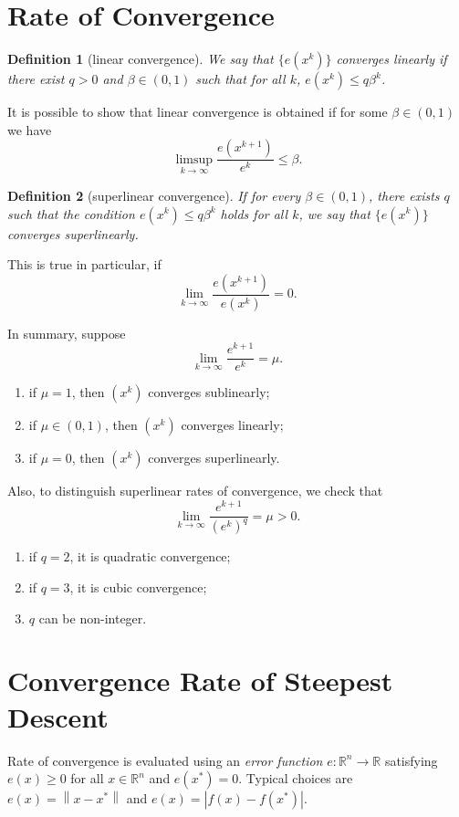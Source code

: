 \documentclass[12pt,a4paper]{report}
\numberwithin{equation}{section}
\theoremstyle{mystyle}
\newtheorem{definition}{Definition}[section]
\newcommand{\R}{\mathbb{R}}
\newcommand{\abs}[1]{\left\lvert #1 \right\rvert}
\newcommand{\norm}[1]{\left\lVert #1 \right\rVert}
\begin{document}
	\section{Rate of Convergence}
		\begin{definition}[linear convergence]
				We say that $\{e(x^k)\}$ converges \emph{linearly} if there exist $q>0$ and $\beta\in (0,1)$ such that for all $k$, $e(x^k)\leq q \beta^k$.
			\end{definition}
	 It is possible to show that linear convergence is obtained if for some $\beta \in (0,1)$ we have
	 $$
	 \limsup_{k\to\infty}\frac{e(x^{k+1})}{e^{k}}\leq \beta.
	 $$
	 \begin{definition}[superlinear convergence]
			 	If for every $\beta\in (0,1)$, there exists $q$ such that the condition $e(x^k)\leq q\beta^k$ holds for all $k$, we say that $\{e(x^k)\}$ converges \emph{superlinearly}.
	 \end{definition}
		This is true in particular, if 
		$$
		\lim_{k\to\infty}\frac{e(x^{k+1})}{e(x^k)}=0.
		$$
	
	In summary, suppose
	$$
	\lim_{k\to\infty}\frac{e^{k+1}}{e^k}=\mu.
	$$
	\begin{enumerate}
		\item if $\mu=1$, then $(x^k)$ converges sublinearly;
		\item if $\mu\in (0,1)$, then $(x^k)$ converges linearly;
		\item if $\mu=0$, then $(x^k)$ converges superlinearly.
	\end{enumerate}
	
	Also, to distinguish superlinear rates of convergence, we check that
	$$
	\lim_{k\to\infty}\frac{e^{k+1}}{(e^k)^q}=\mu>0.
	$$
	\begin{enumerate}
		\item if $q=2$, it is quadratic convergence;
		\item if $q=3$, it is cubic convergence;
		\item $q$ can be non-integer.
	\end{enumerate}
		
		
		
	
	\section{Convergence Rate of Steepest Descent}
	Rate of convergence is evaluated using an \emph{error function} $e: \R^n \to \R$ satisfying $e(x)\geq 0$ for all $x\in \R^n$ and $e(x^*)=0$. Typical choices are $e(x)=\norm{x-x^*}$ and $e(x)=\abs{f(x)-f(x^*)}$.
	
\end{document}
